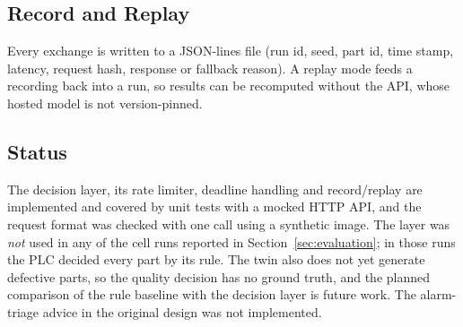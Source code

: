 \subsection{Record and Replay}

Every exchange is written to a JSON-lines file (run id, seed, part id, time stamp, latency,
request hash, response or fallback reason). A replay mode feeds a recording back into a run, so
results can be recomputed without the API, whose hosted model is not version-pinned.

\subsection{Status}

The decision layer, its rate limiter, deadline handling and record/replay are implemented and
covered by unit tests with a mocked HTTP API, and the request format was checked with one call
using a synthetic image. The layer was \emph{not} used in any of the cell runs reported in
Section~\ref{sec:evaluation}; in those runs the PLC decided every part by its rule. The twin
also does not yet generate defective parts, so the quality decision has no ground truth, and the
planned comparison of the rule baseline with the decision layer is future work. The alarm-triage
advice in the original design was not implemented.
